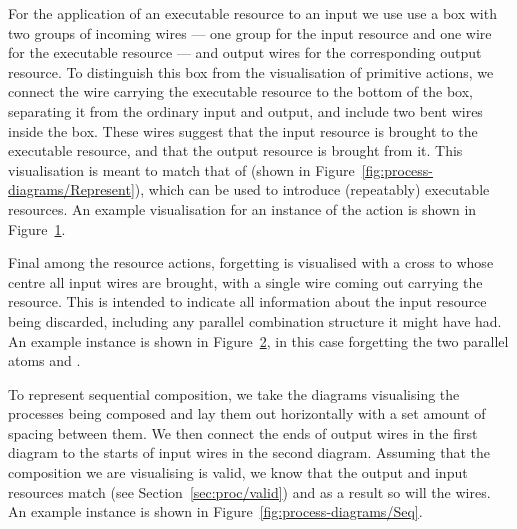 \documentclass[class=smolathesis,crop=false]{standalone}
\begin{document}
\cbstart
For the application of an executable resource to an input we use use a box with two groups of incoming wires --- one group for the input resource and one wire for the executable resource --- and output wires for the corresponding output resource.
To distinguish this box from the visualisation of primitive actions, we connect the wire carrying the executable resource to the bottom of the box, separating it from the ordinary input and output, and include two bent wires inside the box.
These wires suggest that the input resource is brought to the executable resource, and that the output resource is brought from it.
This visualisation is meant to match that of  (shown in Figure~\ref{fig:process-diagrams/Represent}), which can be used to introduce (repeatably) executable resources.
An example visualisation for an instance of the  action is shown in Figure~\ref{fig:process-diagrams/Apply}.
\cbend

\begin{figure}[h]
  \centering
  
  \caption{}
  \label{fig:process-diagrams/Apply}
\end{figure}

\cbstart
Final among the resource actions, forgetting is visualised with a cross to whose centre all input wires are brought, with a single wire coming out carrying the  resource.
This is intended to indicate all information about the input resource being discarded, including any parallel combination structure it might have had.
An example instance is shown in Figure~\ref{fig:process-diagrams/Forget}, in this case forgetting the two parallel atoms  and .
\cbend

\begin{figure}[h]
  \centering
  
  \caption{}
  \label{fig:process-diagrams/Forget}
\end{figure}

\cbstart
To represent sequential composition, we take the diagrams visualising the processes being composed and lay them out horizontally with a set amount of spacing between them.
We then connect the ends of output wires in the first diagram to the starts of input wires in the second diagram.
Assuming that the composition we are visualising is valid, we know that the output and input resources match (see Section~\ref{sec:proc/valid}) and as a result so will the wires.
An example instance is shown in Figure~\ref{fig:process-diagrams/Seq}.
\cbend
\end{document}
